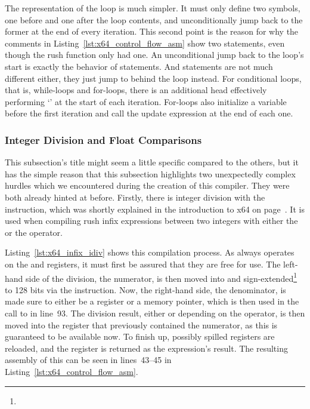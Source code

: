 
The representation of the loop is much simpler.
It must only define two symbols, one before and one after the loop contents, and unconditionally jump back to the former at the end of every iteration.
This second point is the reason for why the comments in Listing~\ref{lst:x64_control_flow_asm} show two  statements, even though the rush function only had one.
An unconditional jump back to the loop's start is exactly the behavior of  statements.
And  statements are not much different either, they just jump to behind the loop instead.
For conditional loops, that is, while-loops and for-loops, there is an additional head effectively performing `' at the start of each iteration.
For-loops also initialize a variable before the first iteration and call the update expression at the end of each one.

\subsubsection{Integer Division and Float Comparisons}

This subsection's title might seem a little specific compared to the others, but it has the simple reason that this subsection highlights two unexpectedly complex hurdles which we encountered during the creation of this compiler.
They were both already hinted at before.
Firstly, there is integer division with the  instruction, which was shortly explained in the introduction to x64 on page~\pageref{x64_idiv}.
It is used when compiling rush infix expressions between two integers with either the \qVerb{/} or the \qVerbCmd{\%} operator.


Listing~\ref{lst:x64_infix_idiv} shows this compilation process.
As  always operates on the  and  registers, it must first be assured that they are free for use.
The left-hand side of the division, the numerator, is then moved into  and sign-extended\footnote{} to 128 bits via the  instruction.
Now, the right-hand side, the denominator, is made sure to either be a register or a memory pointer, which is then used in the call to  in line~93.
The division result, either  or  depending on the operator, is then moved into the register that previously contained the numerator, as this is guaranteed to be available now.
To finish up, possibly spilled registers are reloaded, and the register is returned as the expression's result.
The resulting assembly of this can be seen in lines~43--45 in Listing~\ref{lst:x64_control_flow_asm}.

